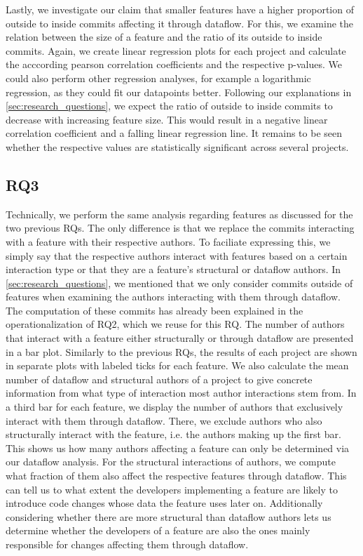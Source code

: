 Lastly, we investigate our claim that smaller features have a higher proportion of outside to inside commits affecting it through dataflow.
For this, we examine the relation between the size of a feature and the ratio of its outside to inside commits.
Again, we create linear regression plots for each project and calculate the acccording pearson correlation coefficients and the respective p-values.
We could also perform other regression analyses, for example a logarithmic regression, as they could fit our datapoints better.
Following our explanations in \autoref{sec:research_questions}, we expect the ratio of outside to inside commits to decrease with increasing feature size.
This would result in a negative linear correlation coefficient and a falling linear regression line.
It remains to be seen whether the respective values are statistically significant across several projects.

\subsection{\textbf{RQ3}}\label{sec:op:RQ3}

Technically, we perform the same analysis regarding features as discussed for the two previous RQs.
The only difference is that we replace the commits interacting with a feature with their respective authors.
To faciliate expressing this, we simply say that the respective authors interact with features based on a certain interaction type or that they are a feature's structural or dataflow authors.
In \autoref{sec:research_questions}, we mentioned that we only consider commits outside of features when examining the authors interacting with them through dataflow.
The computation of these commits has already been explained in the operationalization of RQ2, which we reuse for this RQ.
The number of authors that interact with a feature either structurally or through dataflow are presented in a bar plot.
Similarly to the previous RQs, the results of each project are shown in separate plots with labeled ticks for each feature.
We also calculate the mean number of dataflow and structural authors of a project to give concrete information from what type of interaction most author interactions stem from.
In a third bar for each feature, we display the number of authors that exclusively interact with them through dataflow.
There, we exclude authors who also structurally interact with the feature, i.e. the authors making up the first bar.
This shows us how many authors affecting a feature can only be determined via our dataflow analysis.
For the structural interactions of authors, we compute what fraction of them also affect the respective features through dataflow.
This can tell us to what extent the developers implementing a feature are likely to introduce code changes whose data the feature uses later on.
Additionally considering whether there are more structural than dataflow authors lets us determine whether the developers of a feature are also the ones mainly responsible for changes affecting them through dataflow.

